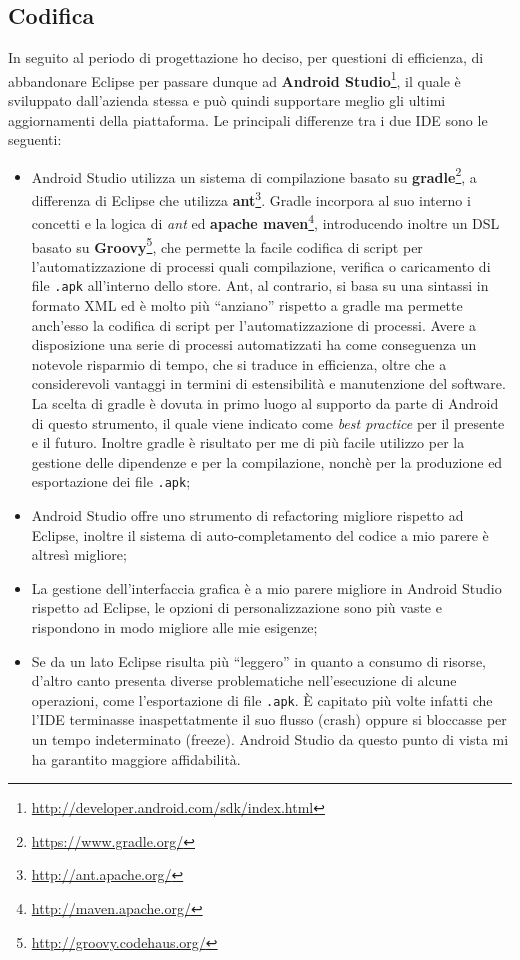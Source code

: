 \subsection*{Codifica}

In seguito al periodo di progettazione ho deciso, per questioni di efficienza, di abbandonare Eclipse per passare dunque ad \textbf{Android Studio}\footnote{\url{http://developer.android.com/sdk/index.html}}, il quale è sviluppato dall'azienda stessa e può quindi supportare meglio gli ultimi aggiornamenti della piattaforma. Le principali differenze tra i due IDE sono le seguenti:

\begin{itemize}

\item Android Studio utilizza un sistema di compilazione basato su \textbf{gradle}\footnote{\url{https://www.gradle.org/}}, a differenza di Eclipse che utilizza \textbf{ant}\footnote{\url{http://ant.apache.org/}}. Gradle incorpora al suo interno i concetti e la logica di \textit{ant} ed \textbf{apache maven}\footnote{\url{http://maven.apache.org/}}, introducendo inoltre un DSL basato su \textbf{Groovy}\footnote{\url{http://groovy.codehaus.org/}}, che permette la facile codifica di script per l'automatizzazione di processi quali compilazione, verifica o caricamento di file \texttt{.apk} all'interno dello store. Ant, al contrario, si basa su una sintassi in formato XML ed è molto più ``anziano'' rispetto a gradle ma permette anch'esso la codifica di script per l'automatizzazione di processi. Avere a disposizione una serie di processi automatizzati ha come conseguenza un notevole risparmio di tempo, che si traduce in efficienza, oltre che a considerevoli vantaggi in termini di estensibilità e manutenzione del software. La scelta di gradle è dovuta in primo luogo al supporto da parte di Android di questo strumento, il quale viene indicato come \textit{best practice} per il presente e il futuro. Inoltre gradle è risultato per me di più facile utilizzo per la gestione delle dipendenze e per la compilazione, nonchè per la produzione ed esportazione dei file \texttt{.apk};
\item Android Studio offre uno strumento di \gls{refactoring} migliore rispetto ad Eclipse, inoltre il sistema di auto-completamento del codice a mio parere è altresì migliore;
\item La gestione dell'interfaccia grafica è a mio parere migliore in Android Studio rispetto ad Eclipse, le opzioni di personalizzazione sono più vaste e rispondono in modo migliore alle mie esigenze;
\item Se da un lato Eclipse risulta più ``leggero'' in quanto a consumo di risorse, d'altro canto presenta diverse problematiche nell'esecuzione di alcune operazioni, come l'esportazione di file \texttt{.apk}. È capitato più volte infatti che l'IDE terminasse inaspettatmente il suo flusso (\gls{crash}) oppure si bloccasse per un tempo indeterminato (\gls{freeze}). Android Studio da questo punto di vista mi ha garantito maggiore affidabilità. 

\end{itemize}

